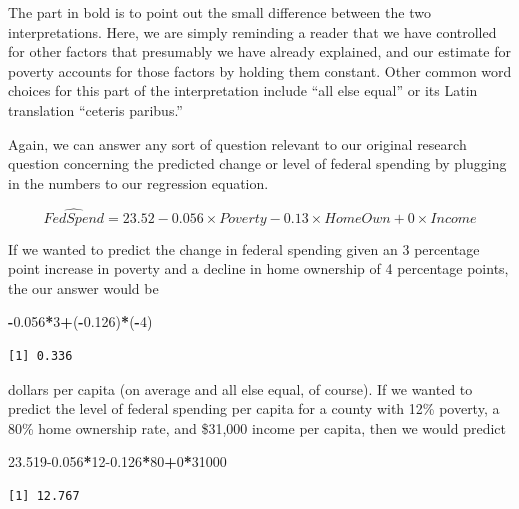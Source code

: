 \documentclass[
]{book}
\makeatletter
\newenvironment{Shaded}{\begin{snugshade}}{\end{snugshade}}
\newcommand{\DecValTok}[1]{\textcolor[rgb]{0.06,0.06,0.06}{#1}}
\newcommand{\FloatTok}[1]{\textcolor[rgb]{0.06,0.06,0.06}{#1}}
\newcommand{\NormalTok}[1]{#1}
\newcommand{\SpecialCharTok}[1]{\textcolor[rgb]{0.43,0.43,0.43}{\textbf{#1}}}
\newenvironment{kframe}{%
\medskip{}
\setlength{\fboxsep}{.8em}
 \def\at@end@of@kframe{}%
 \ifinner\ifhmode%
  \def\at@end@of@kframe{\end{minipage}}%
  \begin{minipage}{\columnwidth}%
 \fi\fi%
 \def\FrameCommand##1{\hskip\@totalleftmargin \hskip-\fboxsep
 \colorbox{shadecolor}{##1}\hskip-\fboxsep
     \hskip-\linewidth \hskip-\@totalleftmargin \hskip\columnwidth}%
 \MakeFramed {\advance\hsize-\width
   \@totalleftmargin\z@ \linewidth\hsize
   \@setminipage}}%
 {\par\unskip\endMakeFramed%
 \at@end@of@kframe}
\renewenvironment{Shaded}{\begin{kframe}}{\end{kframe}}
\makeatother
\begin{document}
The part in bold is to point out the small difference between the two interpretations. Here, we are simply reminding a reader that we have controlled for other factors that presumably we have already explained, and our estimate for poverty accounts for those factors by holding them constant. Other common word choices for this part of the interpretation include ``all else equal'' or its Latin translation ``ceteris paribus.''

Again, we can answer any sort of question relevant to our original research question concerning the predicted change or level of federal spending by plugging in the numbers to our regression equation.

\begin{equation}
\hat{FedSpend} = 23.52 - 0.056 \times Poverty - 0.13 \times HomeOwn + 0 \times Income
\end{equation}

If we wanted to predict the change in federal spending given an 3 percentage point increase in poverty and a decline in home ownership of 4 percentage points, the our answer would be

\begin{Shaded}
\begin{Highlighting}[]
\SpecialCharTok{{-}}\FloatTok{0.056}\SpecialCharTok{*}\DecValTok{3}\SpecialCharTok{+}\NormalTok{(}\SpecialCharTok{{-}}\FloatTok{0.126}\NormalTok{)}\SpecialCharTok{*}\NormalTok{(}\SpecialCharTok{{-}}\DecValTok{4}\NormalTok{)}
\end{Highlighting}
\end{Shaded}

\begin{verbatim}
[1] 0.336
\end{verbatim}

dollars per capita (on average and all else equal, of course). If we wanted to predict the level of federal spending per capita for a county with 12\% poverty, a 80\% home ownership rate, and \$31,000 income per capita, then we would predict

\begin{Shaded}
\begin{Highlighting}[]
\FloatTok{23.519{-}0.056}\SpecialCharTok{*}\DecValTok{12}\FloatTok{{-}0.126}\SpecialCharTok{*}\DecValTok{80}\SpecialCharTok{+}\DecValTok{0}\SpecialCharTok{*}\DecValTok{31000}
\end{Highlighting}
\end{Shaded}

\begin{verbatim}
[1] 12.767
\end{verbatim}
\end{document}
